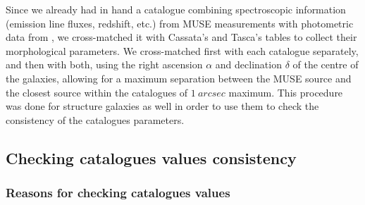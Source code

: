 Since we already had in hand a catalogue combining spectroscopic information (emission line fluxes, redshift, etc.) from MUSE measurements with photometric data from , we cross-matched it with Cassata's and Tasca's tables to collect their morphological parameters. We cross-matched first with each catalogue separately, and then with both, using the right ascension $\alpha$ and declination $\delta$ of the centre of the galaxies, allowing for a maximum separation between the MUSE source and the closest source within the catalogues of $\SI{1}{arcsec}$ maximum. This procedure was done for structure galaxies as well in order to use them to check the consistency of the catalogues parameters.

\subsection{Checking catalogues values consistency}
\subsubsection{Reasons for checking catalogues values}

